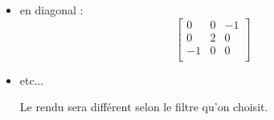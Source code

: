 \documentclass{article}
\begin{document}
\begin{enumerate}[label=\arabic*$\degres$)]
\begin{itemize}
	\item en diagonal :
\[
\begin{bmatrix}
0 & 0 & -1\\
0 & 2 & 0\\
-1 & 0 & 0\\
\end{bmatrix}
\]
	\item etc...
	
Le rendu sera différent selon le filtre qu'on choisit.

\end{itemize}
\end{enumerate}
\end{document}
